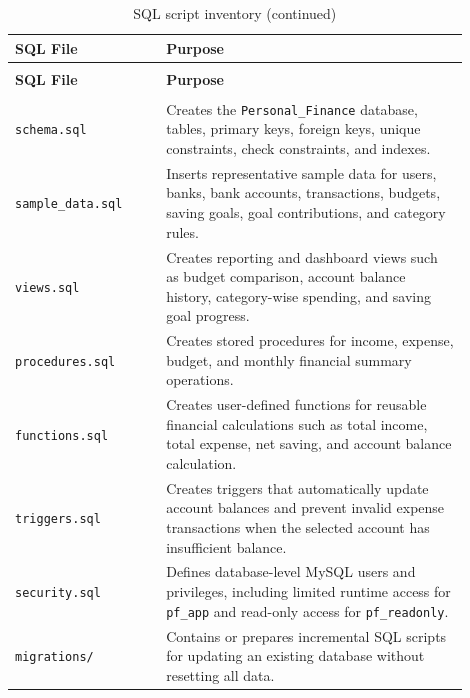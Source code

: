 \documentclass{article}
\begin{document}
\begin{longtable}{
    >{\raggedright\arraybackslash}p{0.30\linewidth}
    J{0.60\linewidth}
}
\caption{SQL script inventory}
\label{tab:sql-script-inventory} \\

\toprule
\textbf{SQL File} & \textbf{Purpose} \\
\midrule
\endfirsthead

\caption[]{SQL script inventory (continued)} \\

\toprule
\textbf{SQL File} & \textbf{Purpose} \\
\midrule
\endhead

\midrule
{} \\
\endfoot

\bottomrule
\endlastfoot

\texttt{schema.sql} 
& Creates the \texttt{Personal\_Finance} database, tables, primary keys, foreign keys, unique constraints, check constraints, and indexes. \\

\texttt{sample\_data.sql} 
& Inserts representative sample data for users, banks, bank accounts, transactions, budgets, saving goals, goal contributions, and category rules. \\

\texttt{views.sql} 
& Creates reporting and dashboard views such as budget comparison, account balance history, category-wise spending, and saving goal progress. \\

\texttt{procedures.sql} 
& Creates stored procedures for income, expense, budget, and monthly financial summary operations. \\

\texttt{functions.sql} 
& Creates user-defined functions for reusable financial calculations such as total income, total expense, net saving, and account balance calculation. \\

\texttt{triggers.sql} 
& Creates triggers that automatically update account balances and prevent invalid expense transactions when the selected account has insufficient balance. \\

\texttt{security.sql} 
& Defines database-level MySQL users and privileges, including limited runtime access for \texttt{pf\_app} and read-only access for \texttt{pf\_readonly}. \\

\texttt{migrations/} 
& Contains or prepares incremental SQL scripts for updating an existing database without resetting all data. \\

\end{longtable}
\normalsize
\end{document}

